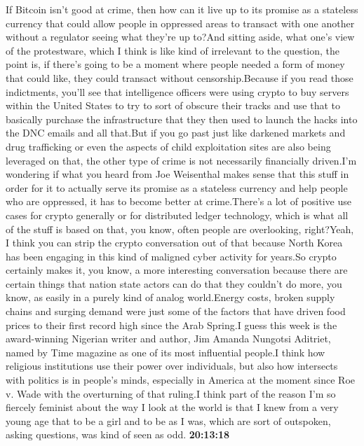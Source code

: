 \documentclass{article}%
\begin{document}
If Bitcoin isn't good at crime, then how can it live up to its promise as a stateless currency that could allow people in oppressed areas to transact with one another without a regulator seeing what they're up to?And sitting aside, what one's view of the protestware, which I think is like kind of irrelevant to the question, the point is, if there's going to be a moment where people needed a form of money that could like, they could transact without censorship.Because if you read those indictments, you'll see that intelligence officers were using crypto to buy servers within the United States to try to sort of obscure their tracks and use that to basically purchase the infrastructure that they then used to launch the hacks into the DNC emails and all that.But if you go past just like darkened markets and drug trafficking or even the aspects of child exploitation sites are also being leveraged on that, the other type of crime is not necessarily financially driven.I'm wondering if what you heard from Joe Weisenthal makes sense that this stuff in order for it to actually serve its promise as a stateless currency and help people who are oppressed, it has to become better at crime.There's a lot of positive use cases for crypto generally or for distributed ledger technology, which is what all of the stuff is based on that, you know, often people are overlooking, right?Yeah, I think you can strip the crypto conversation out of that because North Korea has been engaging in this kind of maligned cyber activity for years.So crypto certainly makes it, you know, a more interesting conversation because there are certain things that nation state actors can do that they couldn't do more, you know, as easily in a purely kind of analog world.Energy costs, broken supply chains and surging demand were just some of the factors that have driven food prices to their first record high since the Arab Spring.I guess this week is the award{-}winning Nigerian writer and author, Jim Amanda Nungotsi Aditriet, named by Time magazine as one of its most influential people.I think how religious institutions use their power over individuals, but also how intersects with politics is in people's minds, especially in America at the moment since Roe v. Wade with the overturning of that ruling.I think part of the reason I'm so fiercely feminist about the way I look at the world is that I knew from a very young age that to be a girl and to be as I was, which are sort of outspoken, asking questions, was kind of seen as odd.%
\textbf{20:13:18}%
\newline%
\end{document}
